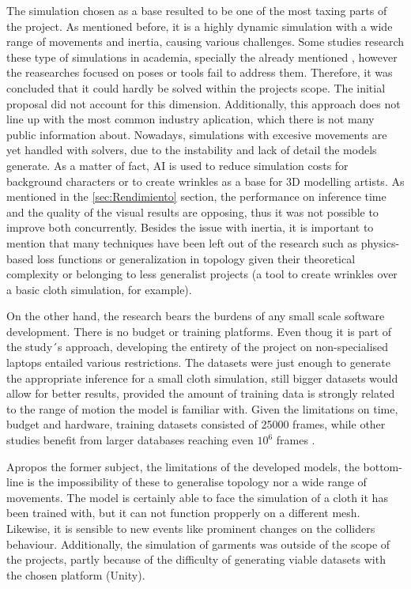 The simulation chosen as a base resulted to be one of the most taxing parts of the project. As mentioned before, it is a highly dynamic simulation with a wide range of movements and inertia, causing various challenges. Some studies research these type of simulations in academia, specially the already mentioned \cite{bertiche2022neural}, however the reasearches focused on poses or tools fail to address them. Therefore, it was concluded that it could hardly be solved within the projects scope. The initial proposal did not account for this dimension. Additionally, this approach does not line up with the most common industry aplication, which there is not many public information about. Nowadays, simulations with excesive movements are yet handled with solvers, due to the instability and lack of detail the models generate. As a matter of fact, AI is used to reduce simulation costs for background characters or to create wrinkles as a base for 3D modelling artists. As mentioned in the \ref{sec:Rendimiento} section, the performance on inference time and the quality of the visual results are opposing, thus it was not possible to improve both concurrently. Besides the issue with inertia, it is important to mention that many techniques have been left out of the research such as physics-based loss functions or generalization in topology given their theoretical complexity or belonging to less generalist projects (a tool to create wrinkles over a basic cloth simulation, for example). \newline

On the other hand, the research bears the burdens of any small scale software development. There is no budget or training platforms. Even thoug it is part of the study´s approach, developing the entirety of the project on non-specialised laptops entailed various restrictions. The datasets were just enough to generate the appropriate inference for a small cloth simulation, still bigger datasets would allow for better results, provided the amount of training data is strongly related to the range of motion the model is familiar with. Given the limitations on time, budget and hardware, training datasets consisted of 25000 frames, while other studies benefit from larger databases reaching even $10^{6}$ frames \cite{holden_subspace_2019}. \newline

Apropos the former subject, the limitations of the developed models, the bottom-line is the impossibility of these to generalise topology nor a wide range of movements. The model is certainly able to face the simulation of a cloth it has been trained with, but it can not function propperly on a different mesh. Likewise, it is sensible to new events like prominent changes on the colliders behaviour. Additionally, the simulation of garments was outside of the scope of the projects, partly because of the difficulty of generating viable datasets with the chosen platform (Unity).

